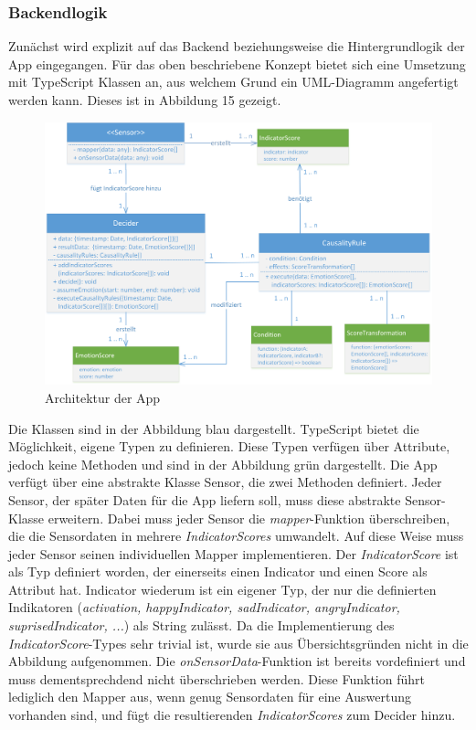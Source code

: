 \subsubsection{Backendlogik}
Zunächst wird explizit auf das Backend beziehungsweise die Hintergrundlogik der App eingegangen. Für das oben beschriebene Konzept bietet sich eine Umsetzung mit TypeScript Klassen an, aus welchem Grund ein UML-Diagramm angefertigt werden kann. Dieses ist in Abbildung 15 gezeigt. \newline
\begin{figure}[h]
	\centering
	\includegraphics[width=16cm]{Bilder/architecture.png}
	\caption[Architektur der App]{Architektur der App}
\end{figure}%
\newline
Die Klassen sind in der Abbildung blau dargestellt. TypeScript bietet die Möglichkeit, eigene Typen zu definieren. Diese Typen verfügen über Attribute, jedoch keine Methoden und sind in der Abbildung grün dargestellt. \newline \newline
Die App verfügt über eine abstrakte Klasse Sensor, die zwei Methoden definiert. Jeder Sensor, der später Daten für die App liefern soll, muss diese abstrakte Sensor-Klasse erweitern. Dabei muss jeder Sensor die \textit{mapper}-Funktion überschreiben, die die Sensordaten in mehrere \textit{IndicatorScores} umwandelt. Auf diese Weise muss jeder Sensor seinen individuellen Mapper implementieren. Der \textit{IndicatorScore} ist als Typ definiert worden, der einerseits einen Indicator und einen Score als Attribut hat. Indicator wiederum ist ein eigener Typ, der nur die definierten Indikatoren (\textit{activation, happyIndicator, sadIndicator, angryIndicator, suprisedIndicator, ...}) als String zulässt. Da die Implementierung des \textit{IndicatorScore}-Types sehr trivial ist, wurde sie aus Übersichtsgründen nicht in die Abbildung aufgenommen. Die \textit{onSensorData}-Funktion ist bereits vordefiniert und muss dementsprechdend nicht überschrieben werden. Diese Funktion führt lediglich den Mapper aus, wenn genug Sensordaten für eine Auswertung vorhanden sind, und fügt die resultierenden \textit{IndicatorScores} zum Decider hinzu. \newline \newline
